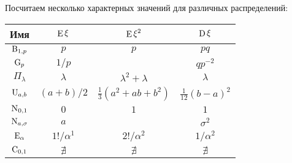 Посчитаем несколько характерных значений для различных распределений:

\begin{table}[h]
\centering
\begin{tabular}{c|ccc}
 Имя & $\mathop{\mathrm{E}}\nolimits \xi$ & $\mathop{\mathrm{E}}\nolimits \xi^2$ & $\mathop{\mathrm{D}}\nolimits \xi$ \\ 
 \hline
 $\textnormal{B}_{1, p}$ & $p$ & $p$ & $pq$ \\
 $\textnormal{G}_{p}$ & $1/p$ &  & $q p^{-2}$ \\
 $\Pi_{\lambda}$ & $\lambda$ & $\lambda^2 + \lambda$ & $\lambda$ \\
 $\textnormal{U}_{a, b}$ & $(a+b)/2$ & $\frac{1}{3} (a^2 + ab + b^2)$ & $\frac{1}{12} (b-a)^2$ \\
 $\textnormal{N}_{0,1}$ & $0$ & $1$ & $1$ \\
 $\textnormal{N}_{a,\sigma}$ & $a$ &  & $\sigma^2$ \\
 $\textnormal{E}_{\alpha}$ & $1!/\alpha^1$ & $2!/\alpha^2$ & $1/\alpha^2$ \\
 $\textnormal{C}_{0, 1}$ & $\nexists$  & $\nexists$  & $\nexists$ \\
\end{tabular}
\end{table}